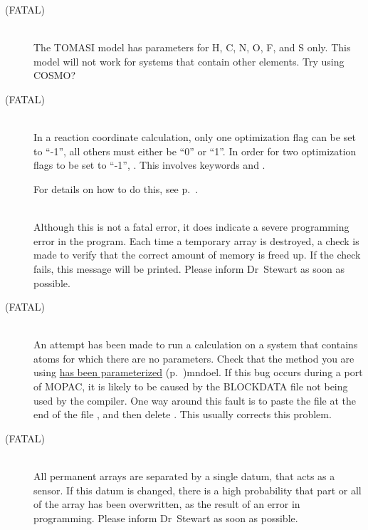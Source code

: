 \begin{description}
\item[ (FATAL)]~\\
The TOMASI model has parameters for H, C, N, O, F, and S only.  This
model will not work for systems that contain other elements.  Try using
COSMO?
 
\item[ (FATAL)]~\\
In a reaction coordinate calculation, only one optimization flag can be
set to ``-1'', all others must either be ``0'' or ``1''.  In order for
two optimization flags to be set to ``-1'', .  This involves  keywords  and
.  
\begin{latexonly}
For details on how to do this, see p.~\pageref{step}.
\end{latexonly}

\item[]~\\
Although this is not a fatal error, it does indicate a severe programming
error  in the program. Each time a temporary array is destroyed, a check is
made to verify that the correct amount of memory is freed up.  If the check
fails, this message will be printed.  Please inform Dr~Stewart as soon as
possible.

\item[ (FATAL)]~\\
An attempt has been made to run a calculation on a system that contains
atoms for which there are no parameters.  Check that the method you are
using \hyperref[pageref]{has been parameterized}{ (p.~}{)}{mndoel}.  If
this bug occurs during a port of MOPAC, it is likely to be caused by
the BLOCKDATA file not being used by the compiler.  One way around this
fault is to paste the file  at the end of the file
, and then delete .  This usually corrects
this problem.

\item[ (FATAL)]~\\
All permanent arrays are separated by a single datum, that acts as a
sensor.  If this datum is changed, there is a high probability that
part or all of the array has been overwritten, as the result of an
error in programming.  Please inform Dr~Stewart as soon as possible.


\end{description}
